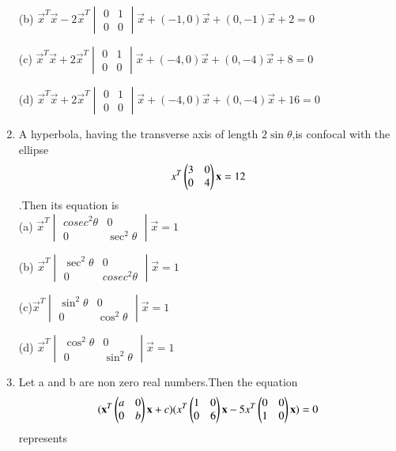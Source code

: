 \documentclass[journal,12pt,twocolumn]{IEEEtran}
\begin{document}
\begin{enumerate}
     \choice (b) $\vec x^T\vec x-2\vec x^T\begin{vmatrix} 0&1\\0&0 \end{vmatrix} \vec x+(-1,0)\vec x+(0,-1)\vec x+2=0$
     
      \choice (c) $\vec x^T\vec x+2\vec x^T\begin{vmatrix} 0&1\\0&0 \end{vmatrix} \vec x+(-4,0)\vec x+(0,-4)\vec x+8=0$
      
      \choice (d) $\vec x^T\vec x+2\vec x^T\begin{vmatrix} 0&1\\0&0 \end{vmatrix} \vec x+(-4,0)\vec x+(0,-4)\vec x+16=0$\\
      
      \item A hyperbola, having the transverse axis of length $2\sin\theta$,is confocal with the ellipse \begin{align} x^T\begin{pmatrix}3&0\\0&4 \end{pmatrix}\mathbf x=12\end{align}.Then its equation is \\
      
      \choice (a) $\vec x^T\begin{vmatrix} cosec^2 \theta&0\\0&\sec^2\theta \end{vmatrix} \vec x =1$
      
      \choice (b) $\vec x^T\begin{vmatrix} \sec^2\theta&0\\0& cosec^2\theta \end{vmatrix} \vec x=1$
     
      
      \choice (c)$\vec x^T\begin{vmatrix} \sin^2\theta&0\\0&\cos^2\theta \end{vmatrix} \vec x=1$
      
      \choice (d) $\vec x^T\begin{vmatrix} \cos^2\theta&0\\0&\sin^2\theta \end{vmatrix} \vec x=1$\\
      
      \item Let a and b are non zero real numbers.Then the equation \begin{align}(\mathbf x^T\begin{pmatrix} a&0\\0&b \end{pmatrix}\mathbf x+c)( x^T\begin{pmatrix}1&0\\0&6\end{pmatrix} \mathbf x-5x^T\begin{pmatrix}0&0\\1&0\end{pmatrix} \mathbf x)=0\end{align}represents\\
      

\end{enumerate}
\end{document}
